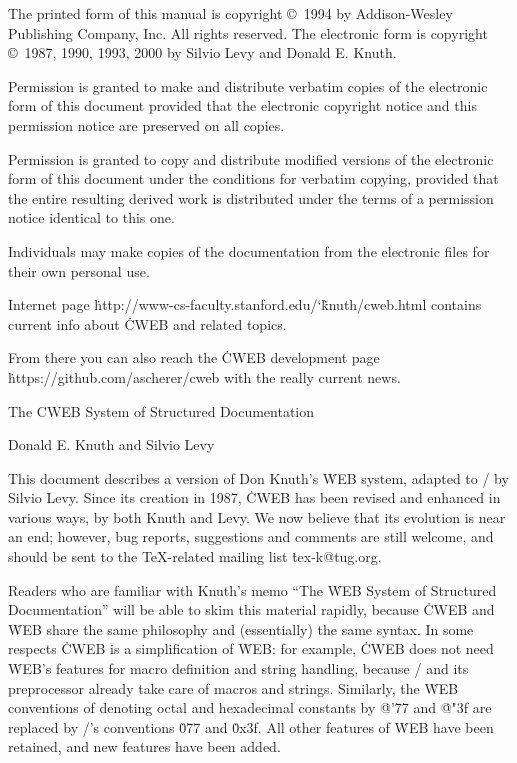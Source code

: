 \bigskip\noindent
The printed form of this manual is copyright \copyright\ 1994
  by Addison-Wesley Publishing Company, Inc.  All rights reserved.
\smallskip\noindent
The electronic form is copyright \copyright\ 1987, 1990, 1993, 2000
  by Silvio Levy and Donald E. Knuth.

\bigskip\noindent
Permission is granted to make and distribute verbatim copies of the
electronic form of this document provided that the electronic copyright
notice and this permission notice are preserved on all copies.

\smallskip\noindent
Permission is granted to copy and distribute modified versions of the
electronic form of this document under the conditions for verbatim copying,
provided that the entire resulting derived work is distributed under the terms
of a permission notice identical to this one.

\smallskip\noindent
Individuals may make copies of the documentation from the electronic files
for their own personal use.

\smallskip\noindent
Internet page \.{http://www-cs-faculty.stanford.edu/\char`\~knuth/cweb.html}
contains current info about \.{CWEB} and related topics.

\smallskip\noindent
From there you can also reach the \.{CWEB} development page
\.{https://github.com/ascherer/cweb} with the really current news.

 \titletrue\eject

\titletrue
\centerline{\titlefont The {\ttitlefont CWEB} System of
    Structured Documentation}

\centerline{\authorfont Donald E. Knuth and Silvio Levy}

\noindent
This document describes a version of Don Knuth's \.{WEB} system,
adapted to \CEE/ by Silvio Levy.  Since its creation in 1987, \.{CWEB}
has been revised and enhanced in various ways, by both Knuth and Levy.
We now believe that its evolution is near an end; however, bug
reports, suggestions and comments are still welcome, and
should be sent to the \TeX-related mailing list \.{tex-k@tug.org}.

Readers who are familiar with Knuth's memo ``The \.{WEB} System of Structured
Documentation'' will be able
to skim this material rapidly, because \.{CWEB} and \.{WEB} share
the same philosophy and (essentially) the same syntax.  In some respects
\.{CWEB} is a simplification
of \.{WEB}: for example, \.{CWEB} does not need \.{WEB}'s features
for macro definition and string handling, because \CEE/ and its
preprocessor already take care of macros and strings. Similarly, the \.{WEB}
conventions of denoting octal and hexadecimal constants by \.{@'77}
and \.{@"3f} are replaced by \CEE/'s conventions \.{077} and
\.{0x3f}. All other features of \.{WEB} have been
retained, and new features have been added.

